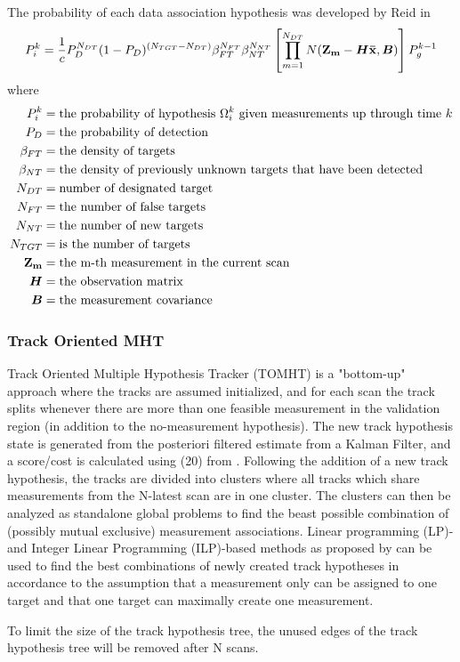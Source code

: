 The probability of each data association hypothesis was developed by Reid in \cite{Reid1978}
\begin{equation}
P_i^k = \frac{1}{c} P_D^{N_{DT}}(1-P_D)^{(N_{TGT}-N_{DT})} \beta_{FT}^{N_{FT}} \beta_{NT}^{N_{NT}} \left[ \prod_{m=1}^{N_{DT}} N(\boldsymbol{\mathbf{Z_m}}-\bm{H}\boldsymbol{\mathbf{\bar{x}}},\bm{B}) \right] P_g^{k-1}
\end{equation}
where 
\begin{equation*}
\begin{split}
	P_i^k		&= \text{the probability of hypothesis $\Omega_i^k$ given measurements up through time $k$} \\
	P_D 		&= \text{the probability of detection} \\
	\beta_{FT} 	&= \text{the density of targets} \\
	\beta_{NT}	&= \text{the density of previously unknown targets that have been detected} \\
	N_{DT} 		&=	\text{number of designated target} \\
	N_{FT} 		&= \text{the number of false targets} \\
	N_{NT} 		&= \text{the number of new targets} \\
	N_{TGT} 	&= \text{is the number of targets} \\
	\boldsymbol{\mathbf{Z_m}} 	&= \text{the m-th measurement in the current scan} \\
	\bm{H} 		&= \text{the observation matrix} \\
	\bm{B} 		&= \text{the measurement covariance}
\end{split}
\end{equation*}

\subsubsection{Track Oriented MHT}
Track Oriented Multiple Hypothesis Tracker (TOMHT) is a "bottom-up" approach where the tracks are assumed initialized, and for each scan the track splits whenever there are more than one feasible measurement in the validation region (in addition to the no-measurement hypothesis). The new track hypothesis state is generated from the posteriori filtered estimate from a Kalman Filter, and a score/cost is calculated using (20) from \cite{Bar-Shalom2007}. Following the addition of a new track hypothesis, the tracks are divided into clusters where all tracks which share measurements from the N-latest scan are in one cluster. The clusters can then be analyzed as standalone global problems to find the beast possible combination of (possibly mutual exclusive) measurement associations. Linear programming (LP)- and Integer Linear Programming (ILP)-based methods as proposed by \cite{Storms2003} can be used to find the best combinations of newly created track hypotheses in accordance to the assumption that a measurement only can be assigned to one target and that one target can maximally create one measurement.

To limit the size of the track hypothesis tree, the unused edges of the track hypothesis tree will be removed after N scans.

